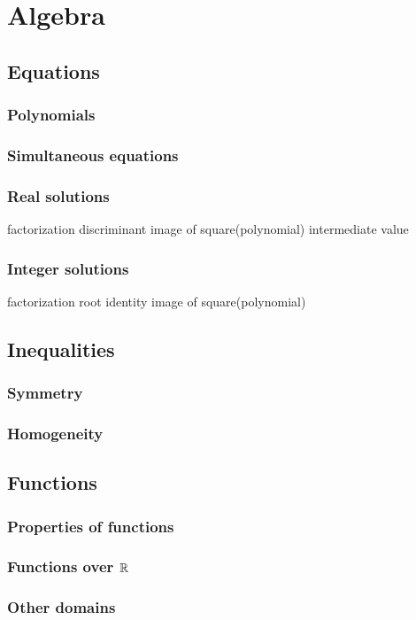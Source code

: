 \documentclass{../../large}
\begin{document}
\tableofcontents

\part{Algebra}
\chapter{Equations}
\section{Polynomials}
\section{Simultaneous equations}
\section{Real solutions}
factorization
discriminant
image of square(polynomial)
intermediate value
\section{Integer solutions}
factorization
root identity
image of square(polynomial)


\chapter{Inequalities}
\section{Symmetry}
\section{Homogeneity}


\chapter{Functions}
\section{Properties of functions}
\section{Functions over $\mathbb{R}$}
\section{Other domains}
\end{document}
